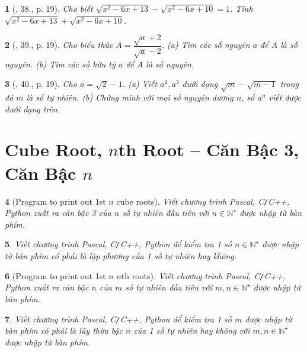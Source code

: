 \documentclass{article}
\newtheorem{baitoan}{}
\begin{document}
\begin{baitoan}[\cite{Binh_Toan_9_tap_1}, 38., p. 19]
	Cho biết $\sqrt{x^2 - 6x + 13} - \sqrt{x^2 - 6x + 10} = 1$. Tính $\sqrt{x^2 - 6x + 13} + \sqrt{x^2 - 6x + 10}$.
\end{baitoan}

\begin{baitoan}[\cite{Binh_Toan_9_tap_1}, 39., p. 19]
	Cho biểu thức $A = \dfrac{\sqrt{a} + 2}{\sqrt{a} - 2}$. (a) Tìm các số nguyên $a$ để $A$ là số nguyên. (b) Tìm các số hữu tỷ $a$ để $A$ là số nguyên.
\end{baitoan}

\begin{baitoan}[\cite{Binh_Toan_9_tap_1}, 40., p. 19]
	Cho $a = \sqrt{2} - 1$. (a) Viết $a^2,a^3$ dưới dạng $\sqrt{m} - \sqrt{m - 1}$ trong đó $m$ là số tự nhiên. (b) Chứng minh với mọi số nguyên dương $n$, số $a^n$ viết được dưới dạng trên.
\end{baitoan}


\section{Cube Root, $n$th Root -- Căn Bậc 3, Căn Bậc $n$}

\begin{baitoan}[Program to print out 1st $n$ cube roots]
	Viết chương trình {\sf Pascal, C\texttt{/}C++, Python} xuất ra căn bậc 3 của $n$ số tự nhiên đầu tiên với $n\in\mathbb{N}^\star$ được nhập từ bàn phím.
\end{baitoan}

\begin{baitoan}
	Viết chương trình {\sf Pascal, C\texttt{/}C++, Python} để kiểm tra 1 số $n\in\mathbb{N}^\star$ được nhập từ bàn phím có phải là lập phương của 1 số tự nhiên hay không.
\end{baitoan}

\begin{baitoan}[Program to print out 1st $n$ $n$th roots]
	Viết chương trình {\sf Pascal, C\texttt{/}C++, Python} xuất ra căn bậc $n$ của $m$ số tự nhiên đầu tiên với $m,n\in\mathbb{N}^\star$ được nhập từ bàn phím.
\end{baitoan}

\begin{baitoan}
	Viết chương trình {\sf Pascal, C\texttt{/}C++, Python} để kiểm tra 1 số $m$ được nhập từ bàn phím có phải là lũy thừa bậc $n$ của 1 số tự nhiên hay không với $m,n\in\mathbb{N}^\star$ được nhập từ bàn phím.
\end{baitoan}
\end{document}
